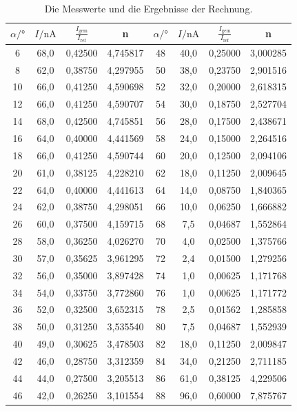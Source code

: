 \begin{table}
  \centering
  \caption{Die Messwerte und die Ergebnisse der Rechnung.}
  \label{tab:mess2}
  \begin{tabular}{c c c c c c c c}
    \toprule
    $\alpha / °$ &     $I / \unit{\nano\ampere}$ & $\frac{I_\text{gem}}{I_\text{ref}}$ & n &$\alpha / °$ &    $I / \unit{\nano\ampere}$ & $\frac{I_\text{gem}}{I_\text{ref}}$& n \\
    \midrule
       6 & 68,0 &    0,42500 & 4,745817 &48 & 40,0 & 0,25000 & 3,000285 \\
       8 & 62,0 &    0,38750 & 4,297955 &50 & 38,0 & 0,23750 & 2,901516 \\
      10 & 66,0 &    0,41250 & 4,590698 &52 & 32,0 & 0,20000 & 2,618315 \\
      12 & 66,0 &    0,41250 & 4,590707 &54 & 30,0 & 0,18750 & 2,527704 \\
      14 & 68,0 &    0,42500 & 4,745851 &56 & 28,0 & 0,17500 & 2,438671 \\
      16 & 64,0 &    0,40000 & 4,441569 &58 & 24,0 & 0,15000 & 2,264516 \\
      18 & 66,0 &    0,41250 & 4,590744 &60 & 20,0 & 0,12500 & 2,094106 \\
      20 & 61,0 &    0,38125 & 4,228210 &62 & 18,0 & 0,11250 & 2,009645 \\
      22 & 64,0 &    0,40000 & 4,441613 &64 & 14,0 & 0,08750 & 1,840365 \\
      24 & 62,0 &    0,38750 & 4,298051 &66 & 10,0 & 0,06250 & 1,666882 \\
      26 & 60,0 &    0,37500 & 4,159715 &68 &  7,5 & 0,04687 & 1,552864 \\
      28 & 58,0 &    0,36250 & 4,026270 &70 &  4,0 & 0,02500 & 1,375766 \\
      30 & 57,0 &    0,35625 & 3,961295 &72 &  2,4 & 0,01500 & 1,279256 \\
      32 & 56,0 &    0,35000 & 3,897428 &74 &  1,0 & 0,00625 & 1,171768 \\
      34 & 54,0 &    0,33750 & 3,772860 &76 &  1,0 & 0,00625 & 1,171772 \\
      36 & 52,0 &    0,32500 & 3,652315 &78 &  2,5 & 0,01562 & 1,285858 \\
      38 & 50,0 &    0,31250 & 3,535540 &80 &  7,5 & 0,04687 & 1,552939 \\
      40 & 49,0 &    0,30625 & 3,478503 &82 & 18,0 & 0,11250 & 2,009847 \\
      42 & 46,0 &    0,28750 & 3,312359 &84 & 34,0 & 0,21250 & 2,711185 \\
      44 & 44,0 &    0,27500 & 3,205513 &86 & 61,0 & 0,38125 & 4,229506 \\
      46 & 42,0 &    0,26250 & 3,101554 &88 & 96,0 & 0,60000 & 7,875767 \\
    \bottomrule
    \end{tabular}
\end{table}

